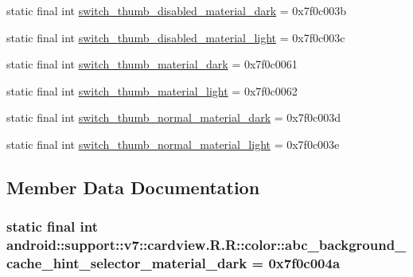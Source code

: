 \begin{CompactItemize}
\item 
static final int \hyperlink{classandroid_1_1support_1_1v7_1_1cardview_1_1_r_1_1color_86b14b8f1a15f775da25f174f44f64e0}{switch\_\-thumb\_\-disabled\_\-material\_\-dark} = 0x7f0c003b
\item 
static final int \hyperlink{classandroid_1_1support_1_1v7_1_1cardview_1_1_r_1_1color_408f88c02a1ec9a9ebb622560317f10e}{switch\_\-thumb\_\-disabled\_\-material\_\-light} = 0x7f0c003c
\item 
static final int \hyperlink{classandroid_1_1support_1_1v7_1_1cardview_1_1_r_1_1color_f7da9f606841c69d0c6de06bf76bed08}{switch\_\-thumb\_\-material\_\-dark} = 0x7f0c0061
\item 
static final int \hyperlink{classandroid_1_1support_1_1v7_1_1cardview_1_1_r_1_1color_ff791bf084e0c771c9f054099d0381eb}{switch\_\-thumb\_\-material\_\-light} = 0x7f0c0062
\item 
static final int \hyperlink{classandroid_1_1support_1_1v7_1_1cardview_1_1_r_1_1color_e2f1450877424ffde30d7950b0feca7a}{switch\_\-thumb\_\-normal\_\-material\_\-dark} = 0x7f0c003d
\item 
static final int \hyperlink{classandroid_1_1support_1_1v7_1_1cardview_1_1_r_1_1color_f6fdc3d58bfca1a5d37b77127db94461}{switch\_\-thumb\_\-normal\_\-material\_\-light} = 0x7f0c003e
\end{CompactItemize}


\subsection{Member Data Documentation}
\hypertarget{classandroid_1_1support_1_1v7_1_1cardview_1_1_r_1_1color_f3984ac3eb5a4cfcd806563e9c586fb8}{
\subsubsection[{abc\_\-background\_\-cache\_\-hint\_\-selector\_\-material\_\-dark}]{\setlength{\rightskip}{0pt plus 5cm}static final int android::support::v7::cardview.R.R::color::abc\_\-background\_\-cache\_\-hint\_\-selector\_\-material\_\-dark = 0x7f0c004a}}
\label{classandroid_1_1support_1_1v7_1_1cardview_1_1_r_1_1color_f3984ac3eb5a4cfcd806563e9c586fb8}


